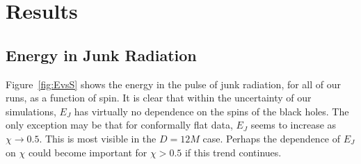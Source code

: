 











\section{Results}
\label{sec:Results}




\subsection{Energy in Junk Radiation}

Figure~\ref{fig:EvsS} shows the energy in the pulse of junk radiation,
for all of our runs, as a function of spin. It is clear that within
the uncertainty of our simulations, $E_J$ has virtually no dependence
on the spins of the black holes. The only exception may be that for
conformally flat data, $E_J$ seems to increase as $\chi\rightarrow
0.5$. This is most visible in the $D=12M$ case. Perhaps the dependence
of $E_J$ on $\chi$ could become important for $\chi > 0.5$ if this
trend continues.

